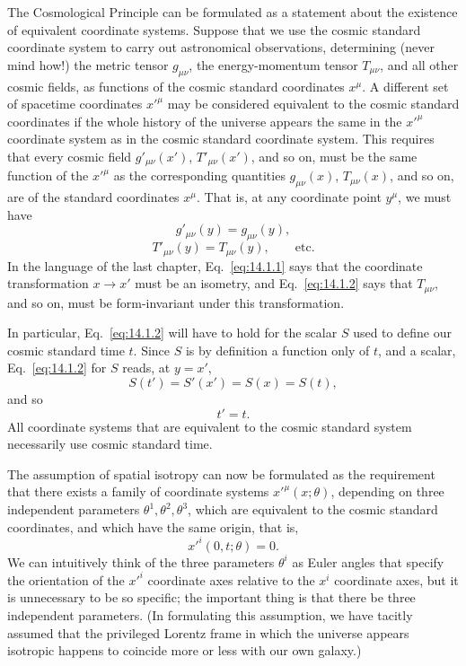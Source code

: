 The Cosmological Principle can be formulated as a statement about the
existence of equivalent coordinate systems. Suppose that we use the cosmic
standard coordinate system to carry out astronomical observations, determining
(never mind how!) the metric tensor \(g_{\mu\nu}\), the energy-momentum tensor
\(T_{\mu\nu}\), and all other cosmic fields, as functions of the cosmic standard
coordinates \(x^\mu\). A different set of spacetime coordinates \(x'^\mu\) may
be considered equivalent to the cosmic standard coordinates if the whole
history of the universe appears the same in the \(x'^\mu\) coordinate system
as in the cosmic standard coordinate system. This requires that every cosmic
field \(g'_{\mu\nu}(x')\), \(T'_{\mu\nu}(x')\), and so on, must be the same
function of the \(x'^\mu\) as the corresponding quantities
\(g_{\mu\nu}(x)\), \(T_{\mu\nu}(x)\), and so on, are of the standard
coordinates \(x^\mu\). That is, at any coordinate point \(y^\mu\), we must
have
\begin{equation}
  g'_{\mu\nu}(y)=g_{\mu\nu}(y),
  \tag{14.1.1}\label{eq:14.1.1}
\end{equation}
\begin{equation}
  T'_{\mu\nu}(y)=T_{\mu\nu}(y),\qquad\text{etc.}
  \tag{14.1.2}\label{eq:14.1.2}
\end{equation}
In the language of the last chapter, Eq.~\eqref{eq:14.1.1} says that the
coordinate transformation \(x\longrightarrow x'\) must be an isometry, and
Eq.~\eqref{eq:14.1.2} says that \(T_{\mu\nu}\), and so on, must be
form-invariant under this transformation.

In particular, Eq.~\eqref{eq:14.1.2} will have to hold for the scalar \(S\)
used to define our cosmic standard time \(t\). Since \(S\) is by definition a
function only of \(t\), and a scalar, Eq.~\eqref{eq:14.1.2} for \(S\) reads,
at \(y=x'\),
\[
  S(t')=S'(x')=S(x)=S(t),
\]
and so
\begin{equation}
  t'=t.
  \tag{14.1.3}\label{eq:14.1.3}
\end{equation}
All coordinate systems that are equivalent to the cosmic standard system
necessarily use cosmic standard time.

The assumption of spatial isotropy can now be formulated as the requirement
that there exists a family of coordinate systems \(x'^\mu(x;\theta)\),
depending on three independent parameters \(\theta^1,\theta^2,\theta^3\),
which are equivalent to the cosmic standard coordinates, and which have the
same origin, that is,
\begin{equation}
  x'^i(0,t;\theta)=0.
  \tag{14.1.4}\label{eq:14.1.4}
\end{equation}
We can intuitively think of the three parameters \(\theta^i\) as Euler angles
that specify the orientation of the \(x'^i\) coordinate axes relative to the
\(x^i\) coordinate axes, but it is unnecessary to be so specific; the
important thing is that there be three independent parameters. (In
formulating this assumption, we have tacitly assumed that the privileged
Lorentz frame in which the universe appears isotropic happens to coincide more
or less with our own galaxy.)

